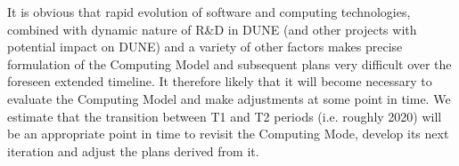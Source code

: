 It is obvious that rapid evolution of software and computing technologies, combined with dynamic nature of R\&D in DUNE (and other  projects with potential impact on DUNE) and a variety of other factors makes precise formulation of the Computing Model and subsequent plans very difficult over the foreseen extended timeline. It  therefore likely that it will become necessary to evaluate the Computing Model and make adjustments at some point in time. We estimate that the transition between T1 and T2 periods (i.e. roughly 2020) will be an appropriate point in time to revisit the Computing Mode, develop its next
iteration and adjust the plans derived from it.

